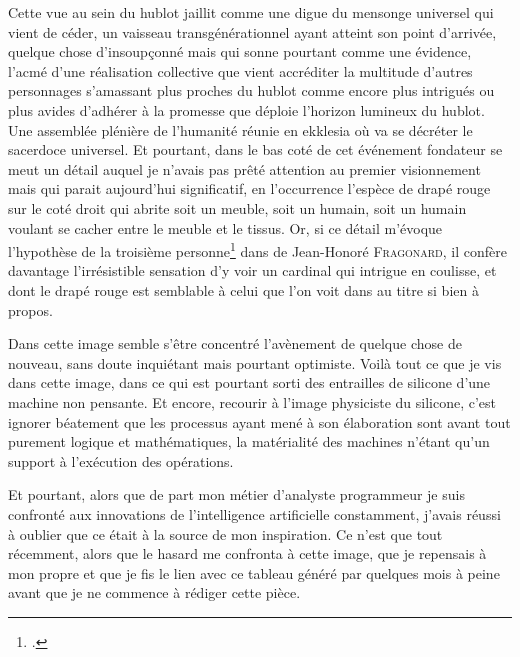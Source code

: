 Cette vue au sein du hublot jaillit comme une digue du mensonge universel qui vient de céder, un vaisseau transgénérationnel ayant atteint son point d’arrivée, quelque chose d’insoupçonné mais qui sonne pourtant comme une évidence, l’acmé d’une réalisation collective que vient accréditer la multitude d’autres personnages s’amassant plus proches du hublot comme encore plus intrigués ou plus avides d’adhérer à la promesse que déploie l’horizon lumineux du hublot. Une assemblée plénière de l’humanité réunie en ekklesia où va se décréter le sacerdoce universel.
Et pourtant, dans le bas coté de cet événement fondateur
se meut un détail auquel je n’avais pas prêté attention au premier visionnement mais qui parait aujourd’hui significatif, en l’occurrence l’espèce de drapé rouge sur le coté droit qui abrite soit un meuble, soit un humain, soit un humain voulant se cacher entre le meuble et le tissus. Or, si ce détail m’évoque l’hypothèse de la troisième personne\footcite[Développée par][]{JPCuzinETDSalmonMenges2007Fragonard-regards-croises} dans  de Jean-Honoré \textsc{Fragonard}, il confère davantage l’irrésistible sensation d’y voir un cardinal qui intrigue en coulisse, et dont le drapé rouge est semblable à celui que l’on voit dans  au titre si bien à propos.

Dans cette image semble s’être concentré l’avènement de quelque chose de nouveau, sans doute inquiétant mais pourtant optimiste. Voilà tout ce que je vis dans cette image, dans ce  qui est pourtant sorti des entrailles de silicone d’une machine non pensante. Et encore, recourir à l’image physiciste du silicone, c’est ignorer béatement que les processus ayant mené à son élaboration sont avant tout purement logique et mathématiques, la matérialité des machines n’étant qu’un support à l’exécution des opérations.


Et pourtant, alors que de part mon métier d’analyste programmeur je suis confronté aux innovations de l’intelligence artificielle constamment, j’avais réussi à oublier que ce  était à la source de mon inspiration. Ce n’est que tout récemment, alors que le hasard me confronta à cette image, que je repensais à mon propre  et que je fis le lien avec ce tableau généré par  quelques mois à peine avant que je ne commence à rédiger cette pièce.
